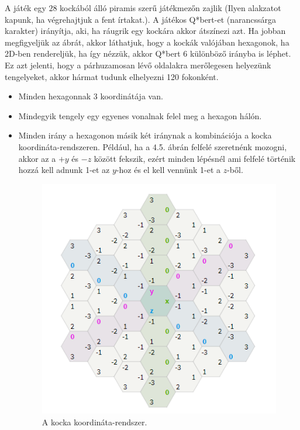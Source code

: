 \noindent A játék egy $28$ kockából álló piramis szerű játékmezőn zajlik (Ilyen alakzatot kapunk, ha végrehajtjuk a fent írtakat.). A játékos Q*bert-et (narancssárga karakter) irányítja, aki, ha ráugrik egy kockára akkor átszínezi azt.
\newline
\newline Ha jobban megfigyeljük az ábrát, akkor láthatjuk, hogy a kockák valójában hexagonok, ha 2D-ben rendereljük, ha így nézzük, akkor Q*bert 6 különböző irányba is léphet. Ez azt jelenti, hogy a párhuzamosan lévő oldalakra merőlegesen helyezünk tengelyeket, akkor hármat tudunk elhelyezni 120 fokonként.

\begin{itemize}
\item Minden hexagonnak 3 koordinátája van. 
\item Mindegyik tengely egy egyenes vonalnak felel meg a hexagon hálón.
\item Minden irány a hexagonon másik két iránynak a kombinációja a kocka koordináta-rendszeren. Például, ha a 4.5. ábrán felfelé szeretnénk mozogni, akkor az a {\color{magenta} $+y$} és {\color{blue} $-z$} között fekszik, ezért minden lépésnél ami felfelé történik hozzá kell adnunk 1-et az {\color{magenta} $y$}-hoz és el kell vennünk 1-et a {\color{blue} $z$}-ből. 

\begin{figure}[h]
\centering
\includegraphics[scale=0.3]{kepek/img45.png}
\caption{A kocka koordináta-rendszer.}
\label{fig:img45}
\end{figure}

\end{itemize}

